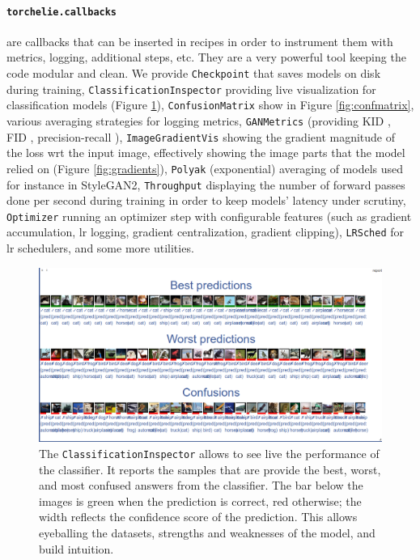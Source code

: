 \paragraph{\texttt{torchelie.callbacks}} are callbacks that can be inserted in recipes in order to instrument them with metrics, logging, additional steps, etc. They are a very powerful tool keeping the code modular and clean. We provide \texttt{Checkpoint} that saves models on disk during training, \texttt{ClassificationInspector} providing live visualization for classification models (Figure \ref{fig:classifreport}), \texttt{ConfusionMatrix} show in Figure \ref{fig:confmatrix}, various averaging strategies for logging metrics, \texttt{GANMetrics} (providing \ac{KID} \cite{kid}, \ac{FID} \cite{fid}, precision-recall \cite{precisionrecall}), \texttt{ImageGradientVis} showing the gradient magnitude of the loss wrt the input image, effectively showing the image parts that the model relied on (Figure \ref{fig:gradients}), \texttt{Polyak} (exponential) averaging of models used for instance in StyleGAN2, \texttt{Throughput} displaying the number of forward passes done per second during training in order to keep models' latency under scrutiny, \texttt{Optimizer} running an optimizer step with configurable features (such as gradient accumulation, lr logging, gradient centralization, gradient clipping), \texttt{LRSched} for lr schedulers, and some more utilities.

\begin{figure}[h]
    \centering
    \includegraphics[width=\columnwidth]{90-files/classifreport.png}
    \caption{The \texttt{ClassificationInspector} allows to see live the performance of the classifier. It reports the samples that are provide the best, worst, and most confused answers from the classifier. The bar below the images is green when the prediction is correct, red otherwise; the width reflects the confidence score of the prediction. This allows eyeballing the datasets, strengths and weaknesses of the model, and build intuition.}
    \label{fig:classifreport}
\end{figure}

